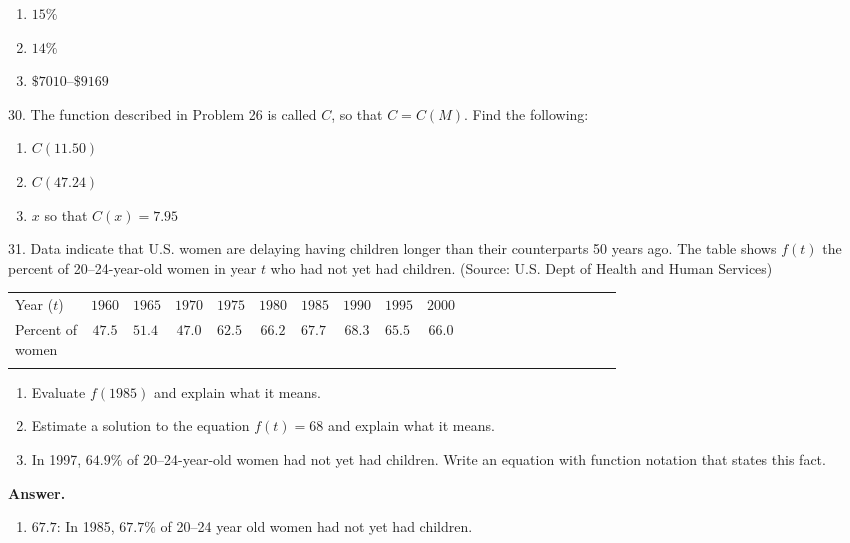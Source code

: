 \documentclass[10pt,]{book}
\makeatletter
\theoremstyle{plain}
\theoremstyle{definition}
\theoremstyle{definition}
\theoremstyle{definition}
\newcommand{\hrulethin}  {\noalign{\hrule height 0.04em}}
\newcommand{\hrulethick} {\noalign{\hrule height 0.11em}}
\newcommand{\tablecelllines}[3]%
{\begin{tabular}[#2]{@{}#1@{}}#3\end{tabular}}
\makeatother
\begin{document}
\begin{exerciselist}
\begin{enumerate}[label=\alph*]
\item\hypertarget{li-94}{}\(15\%\)%
\item\hypertarget{li-95}{}\(14\%\)%
\item\hypertarget{li-96}{}\(\$7010–\$9169\)%
\end{enumerate}
%
\item[30.]\hypertarget{exercise-40}{}The function described in Problem 26 is called \(C\), so that \(C = C( M)\). Find the following: \leavevmode%
\begin{enumerate}[label=\alph*]
\item\hypertarget{li-97}{}\(C(11.50)\)%
\item\hypertarget{li-98}{}\(C(47.24)\)%
\item\hypertarget{li-99}{}\(x\) so that \(C(x) = 7.95\)%
\end{enumerate}
%
\par\smallskip
\item[31.]\hypertarget{exercise-41}{}Data indicate that U.S. women are delaying having children longer than their counterparts 50 years ago. The table shows \(f(t)\) the percent of 20–24-year-old women in year \(t\) who had not yet had children. (Source: U.S. Dept of Health and Human Services) \begin{tabular}{AcAcAcAcAcAcAcAcAcAcA}\hrulethick
Year (\(t\))&\(1960\)&\(1965\)&\(1970\)&\(1975\)&\(1980\)&\(1985\)&\(1990\)&\(1995\)&\(2000\)\tabularnewline\hrulethin
\tablecelllines{c}{m}
{Percent of\\
women}
&\(47.5\)&\(51.4\)&\(47.0\)&\(62.5\)&\(66.2\)&\(67.7\)&\(68.3\)&\(65.5\)&\(66.0\)\tabularnewline\hrulethin
\end{tabular}
 \leavevmode%
\begin{enumerate}[label=\alph*]
\item\hypertarget{li-100}{}Evaluate \(f (1985)\) and explain what it means.%
\item\hypertarget{li-101}{}Estimate a solution to the equation \(f (t) = 68\) and explain what it means.%
\item\hypertarget{li-102}{}In 1997, \(64.9\%\) of 20–24-year-old women had not yet had children. Write an equation with function notation that states this fact.%
\end{enumerate}
%
\par\smallskip
\par\smallskip
\noindent\textbf{Answer.}\hypertarget{answer-26}{}\quad
\leavevmode%
\begin{enumerate}[label=\alph*]
\item\hypertarget{li-103}{}\(67.7\): In 1985, \(67.7\%\) of 20–24 year old women had not yet had children.%

\end{enumerate}
\end{exerciselist}
\end{document}
